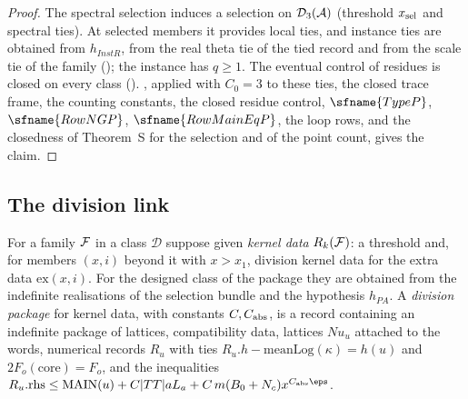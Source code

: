 \begin{proof}
The spectral selection induces a selection on $\mathcal{D}_3(\mathcal A)$ (threshold $x_{\rm sel}$ and spectral ties). At
selected members it provides local ties, and instance ties are obtained from $h_{InstR}$, from the real theta tie of
the tied record and from the scale tie of the family (); the
instance has $q\ge1$. The eventual control of residues is closed on every class
(). , applied with $C_0=3$ to
these ties, the closed trace frame, the counting constants, the closed residue control, $\sfname{TypeP}$,
$\sfname{RowNGP}$, $\sfname{RowMainEqP}$, the loop rows, and the closedness of Theorem~S for the selection and of the
point count, gives the claim.
\end{proof}

\subsection{The division link}\label{sec:pf:top-shape:div}

For a family $\mathcal{F}$ in a class $\mathcal D$ suppose given \emph{kernel data} $R_k(\mathcal{F})$: a threshold and,
for members $(x,i)$ beyond it with $x>x_1$, division kernel data for the extra data $\mathrm{ex}(x,i)$. For the
designed class of the package they are obtained from the indefinite realisations of the selection bundle and the
hypothesis $h_{PA}$. A \emph{division package} for kernel data, with constants $C,C_{\rm abs}$, is a record
containing an indefinite package of lattices, compatibility data, lattices $\mathit{Nu}_u$ attached to the words,
numerical records $R_u$ with ties $R_u.h-\mathrm{meanLog}(\kappa)=h(u)$ and $2F_o(\text{core})=F_o$, and the
inequalities $R_u.\mathrm{rhs}\le\mathrm{MAIN}(u)+C|TT|aL_a+C\,m(B_0+N_c)x^{C_{\rm abs}\eps}$.

